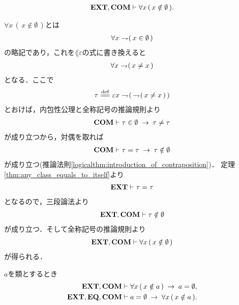	\begin{screen}
		\begin{thm}[空集合はいかなる集合も持たない]\label{thm:emptyset_has_nothing}
			\begin{align}
				\mbox{{\bf EXT}},\mbox{\bf COM} \vdash \forall x\, (\, x \notin \emptyset\, ).
			\end{align}
		\end{thm}
	\end{screen}
	
	\begin{sketch}
		$\forall x\, (\, x \notin \emptyset\, )$とは
		\begin{align}
			\forall x \rightharpoondown\hspace{-0.25em} (\, x \in \emptyset\, )
		\end{align}
		の略記であり，これを$\lang{\varepsilon}$の式に書き換えると
		\begin{align}
			\forall x \rightharpoondown\hspace{-0.25em} (\, x \neq x\, )
		\end{align}
		となる．ここで
		\begin{align}
			\tau \defeq \varepsilon x \negation (\, \negation (\, x \neq x\, )\, )
		\end{align}
		とおけば，内包性公理と全称記号の推論規則より
		\begin{align}
			\mbox{\bf COM} \vdash \tau \in \emptyset \hspace{0.25em}\rightarrow\hspace{0.25em} \tau \neq \tau
		\end{align}
		が成り立つから，対偶を取れば
		\begin{align}
			\mbox{\bf COM} \vdash \tau = \tau \hspace{0.25em}\rightarrow\hspace{0.25em} \tau \notin \emptyset
		\end{align}
		が成り立つ(推論法則\ref{logicalthm:introduction_of_contraposition})．
		定理\ref{thm:any_class_equals_to_itself}より
		\begin{align}
			\mbox{{\bf EXT}} \vdash \tau = \tau
		\end{align}
		となるので，三段論法より
		\begin{align}
			\mbox{{\bf EXT}},\mbox{\bf COM} \vdash \tau \notin \emptyset
		\end{align}
		が成り立つ．そして全称記号の推論規則より
		\begin{align}
			\mbox{{\bf EXT}},\mbox{\bf COM} \vdash \forall x\, (\, x \notin \emptyset\, )
		\end{align}
		が得られる．
		\QED
	\end{sketch}
	
	\begin{screen}
		\begin{thm}[空の類は空集合に等しい]\label{thm:uniqueness_of_emptyset}
			$a$を類とするとき
			\begin{align}
				\mbox{{\bf EXT}},\mbox{\bf COM} &\vdash \forall x\, (\, x \notin a\, ) \hspace{0.25em}\rightarrow\hspace{0.25em} a = \emptyset, \\
				\mbox{{\bf EXT}},\mbox{{\bf EQ}},\mbox{\bf COM} &\vdash a = \emptyset \hspace{0.25em}\rightarrow\hspace{0.25em} \forall x\, (\, x \notin a\, ).
			\end{align}
		\end{thm}
	\end{screen}
	
